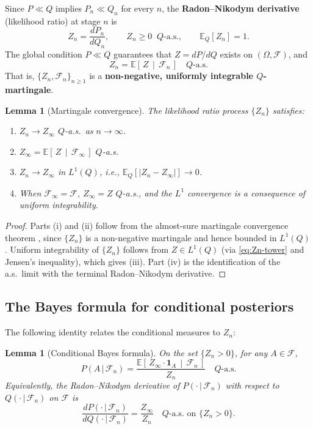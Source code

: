\documentclass[12pt]{article}
\newtheorem{lemma}[theorem]{Lemma}
\newcommand{\E}{\mathbb{E}}
\newcommand{\Ec}[2]{\mathbb{E}\!\left[\,#1\,\middle|\,#2\,\right]}
\begin{document}
Since $P \ll Q$ implies $P_n \ll Q_n$ for every $n$, the
\textbf{Radon--Nikodym derivative} (likelihood ratio) at stage $n$ is
\[
Z_n = \frac{dP_n}{dQ_n}, \qquad Z_n \geq 0 \;\; Q\text{-a.s.},
\qquad \E_Q[Z_n] = 1.
\]
The global condition $P \ll Q$ guarantees that $Z = dP/dQ$ exists on
$(\Omega, \mathscr{F})$, and
\begin{equation}
\label{eq:Zn-tower}
Z_n = \Ec{Z}{\mathscr{F}_n} \quad Q\text{-a.s.}
\end{equation}
That is, $\{Z_n, \mathscr{F}_n\}_{n \geq 1}$ is a \textbf{non-negative,
uniformly integrable $Q$-martingale}.

\begin{lemma}[Martingale convergence]
\label{lem:mart-conv}
The likelihood ratio process $\{Z_n\}$ satisfies:
\begin{enumerate}[label=(\roman*)]
\item $Z_n \to Z_\infty$ $Q$-a.s.\ as $n \to \infty$.
\item $Z_\infty = \Ec{Z}{\mathscr{F}_\infty}$ $Q$-a.s.
\item $Z_n \to Z_\infty$ in $L^1(Q)$, i.e., $\E_Q[|Z_n - Z_\infty|] \to 0$.
\item When $\mathscr{F}_\infty = \mathscr{F}$, $Z_\infty = Z$ $Q$-a.s.,
      and the $L^1$ convergence is a consequence of uniform integrability.
\end{enumerate}
\end{lemma}

\begin{proof}
Parts (i) and (ii) follow from the almost-sure martingale convergence theorem
\citep{doob1953}, since $\{Z_n\}$ is a non-negative martingale and hence
bounded in $L^1(Q)$.  Uniform integrability of $\{Z_n\}$ follows from $Z
\in L^1(Q)$ (via \eqref{eq:Zn-tower} and Jensen's inequality), which gives
(iii).  Part (iv) is the identification of the a.s.\ limit with the terminal
Radon--Nikodym derivative.
\end{proof}

\subsection{The Bayes formula for conditional posteriors}

The following identity relates the conditional measures to $Z_n$:

\begin{lemma}[Conditional Bayes formula]
\label{lem:bayes}
On the set $\{Z_n > 0\}$, for any $A \in \mathscr{F}$,
\begin{equation}
\label{eq:bayes-cond}
P(A\,|\,\mathscr{F}_n) = \frac{\Ec{Z_\infty \cdot \mathbf{1}_A}{\mathscr{F}_n}}{Z_n}
\quad Q\text{-a.s.}
\end{equation}
Equivalently, the Radon--Nikodym derivative of $P(\cdot\,|\,\mathscr{F}_n)$
with respect to $Q(\cdot\,|\,\mathscr{F}_n)$ on $\mathscr{F}$ is
\begin{equation}
\label{eq:cond-RN}
\frac{dP(\cdot\,|\,\mathscr{F}_n)}{dQ(\cdot\,|\,\mathscr{F}_n)}
= \frac{Z_\infty}{Z_n} \quad Q\text{-a.s.\ on } \{Z_n > 0\}.
\end{equation}
\end{lemma}
\end{document}
